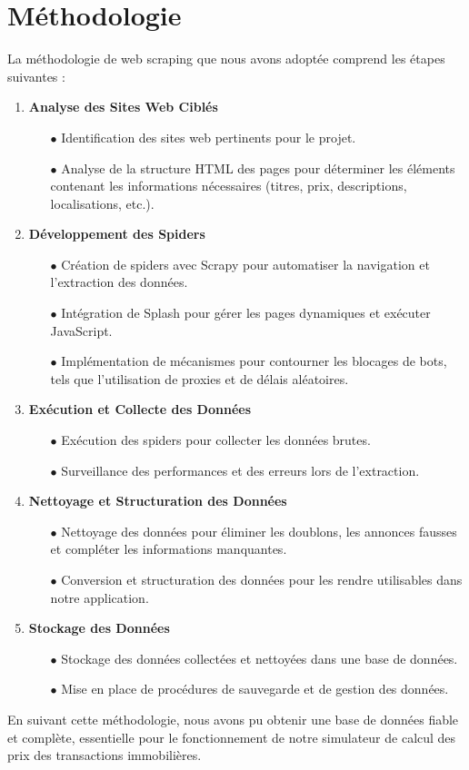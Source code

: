 \documentclass[a4paper,12pt]{report}
\numberwithin{equation}{section}
\begin{document}
\section{Méthodologie}
\large{
\par La méthodologie de web scraping que nous avons adoptée comprend les étapes suivantes :\par
}
\begin{enumerate}
    \item \textbf{Analyse des Sites Web Ciblés}
    \begin{itemize}
        \item[$\bullet$] Identification des sites web pertinents pour le projet.
        \item[$\bullet$] Analyse de la structure HTML des pages pour déterminer les éléments contenant les informations nécessaires (titres, prix, descriptions, localisations, etc.).
    \end{itemize}
    \item \textbf{Développement des Spiders}
    \begin{itemize}
        \item[$\bullet$] Création de spiders avec Scrapy pour automatiser la navigation et l'extraction des données.
        \item[$\bullet$] Intégration de Splash pour gérer les pages dynamiques et exécuter JavaScript.
        \item[$\bullet$] Implémentation de mécanismes pour contourner les blocages de bots, tels que l'utilisation de proxies et de délais aléatoires.
    \end{itemize}
    \item \textbf{Exécution et Collecte des Données}
    \begin{itemize}
        \item[$\bullet$] Exécution des spiders pour collecter les données brutes.
        \item[$\bullet$] Surveillance des performances et des erreurs lors de l'extraction.
    \end{itemize}
    \item \textbf{Nettoyage et Structuration des Données}
    \begin{itemize}
        \item[$\bullet$] Nettoyage des données pour éliminer les doublons, les annonces fausses et compléter les informations manquantes.
        \item[$\bullet$] Conversion et structuration des données pour les rendre utilisables dans notre application.
    \end{itemize}
    \item \textbf{Stockage des Données}
    \begin{itemize}
        \item[$\bullet$] Stockage des données collectées et nettoyées dans une base de données.
        \item[$\bullet$] Mise en place de procédures de sauvegarde et de gestion des données.
    \end{itemize}
\end{enumerate}
\large{
\par En suivant cette méthodologie, nous avons pu obtenir une base de données fiable et complète, essentielle pour le fonctionnement de notre simulateur de calcul des prix des transactions immobilières.\par
}
\end{document}
